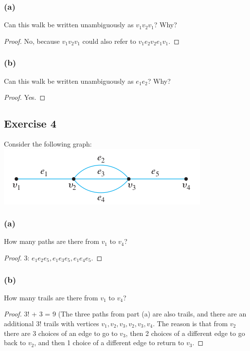 \documentclass[14pt]{extarticle}
\begin{document}
\subsubsection{(a)}
Can this walk be written unambiguously as \(v_1v_2v_1\)? Why?
\begin{proof}
No, because \(v_1v_2v_1\) could also refer to \(v_1e_2v_2e_1v_1\).
\end{proof}

\subsubsection{(b)}
Can this walk be written unambiguously as \(e_1e_2\)? Why?
\begin{proof}
Yes.
\end{proof}

\subsection{Exercise 4}
Consider the following graph:
\includegraphics[scale=0.5]{../images/10.1.4.png}

\subsubsection{(a)}
How many paths are there from \(v_1\) to \(v_4\)?
\begin{proof}
3: \(e_1e_2e_5, e_1e_3e_5, e_1e_4e_5\).
\end{proof}

\subsubsection{(b)}
How many trails are there from \(v_1\) to \(v_4\)?
\begin{proof}
3! + 3 = 9 (The three paths from part (a) are also trails, and there are an additional 3! trails with vertices \(v_1, v_2, 
v_3, v_2, v_3, v_4\). The reason is that from \(v_2\) there are 3 choices of an edge to go to \(v_3\), then 2 choices of a 
different edge to go back to \(v_2\), and then 1 choice of a different edge to return to \(v_3\).
\end{proof}
\end{document}
